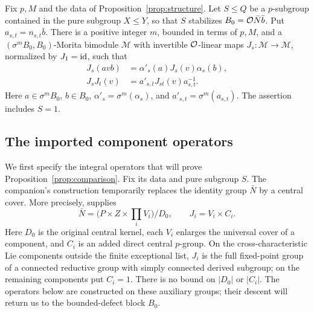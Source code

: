\begin{proposition}\label{prop:comparison}
Fix $p,M$ and the data of Proposition~\ref{prop:structure}.
Let $S\leq Q$ be a $p$-subgroup contained in the pure subgroup
$X\leq Y$, so that $S$ stabilizes $B_0=\mathcal O\bar N\bar b$.
Put $a_{s,t}=n_{s,t}\bar b$.  There is a positive integer $m$,
bounded in terms of $p,M$, and a
$(\sigma^m B_0,B_0)$-Morita bimodule $\mathcal M$ with invertible
$\mathcal O$-linear maps $J_s:\mathcal M\to\mathcal M$, normalized by
$J_1=\mathrm{id}$, such that
\begin{align}
 J_s(avb)&=\alpha'_s(a)J_s(v)\alpha_s(b),
       \label{eq:comparison-covariance}\\
 J_sJ_t(v)&=a'_{s,t}J_{st}(v)a_{s,t}^{-1}.
       \label{eq:comparison-exact}
\end{align}
Here $a\in\sigma^m B_0$, $b\in B_0$,
$\alpha'_s=\sigma^m(\alpha_s)$, and
$a'_{s,t}=\sigma^m(a_{s,t})$.  The assertion includes $S=1$.
\end{proposition}

\subsection{The imported component operators}

We first specify the integral operators that will prove
Proposition~\ref{prop:comparison}.  Fix its data and pure subgroup
$S$.  The companion's construction temporarily replaces the identity
group $\bar N$ by a central cover.  More precisely,
\cite[Lemma~8.2]{OpenAIFieldDonovan2026} supplies
\[
 \bar N=\bigl(P\times Z\times\prod_i V_i\bigr)/D_0,
 \qquad J_i=V_i\times C_i.
\]
Here $D_0$ is the original central kernel, each $V_i$ enlarges the
universal cover of a component, and $C_i$ is an added direct central
$p$-group.  On the cross-characteristic Lie components outside the
finite exceptional list, $J_i$ is the full fixed-point group of a
connected reductive group with simply
connected derived subgroup; on the remaining components put $C_i=1$.
There is no bound on $|D_0|$ or $|C_i|$.
The operators below are constructed on these auxiliary groups; their
descent will return us to the bounded-defect block $B_0$.

